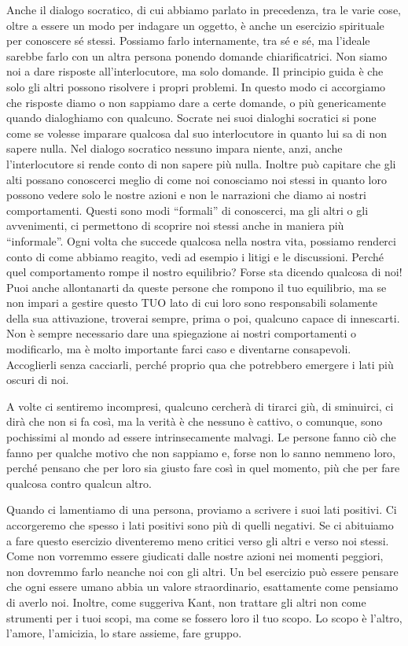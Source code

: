 \documentclass[12pt]{book} %
\begin{document}
Anche il dialogo socratico, di cui abbiamo parlato in precedenza, tra le varie cose, oltre a essere un modo per indagare
un oggetto, è anche un esercizio spirituale per conoscere sé stessi. Possiamo farlo internamente, tra sé e sé, ma
l'ideale sarebbe farlo con un altra persona ponendo domande chiarificatrici. Non siamo noi a dare
risposte all'interlocutore, ma solo domande. Il principio guida è che solo gli altri possono
risolvere i propri problemi. In questo modo ci accorgiamo che risposte diamo o non sappiamo dare a certe domande, o più
genericamente quando dialoghiamo con qualcuno. Socrate nei suoi dialoghi socratici si pone come se volesse imparare
qualcosa dal suo interlocutore in quanto lui sa di non sapere nulla. Nel dialogo socratico nessuno impara niente, anzi,
anche l'interlocutore si rende conto di non sapere più nulla. Inoltre può capitare che gli alti possano conoscerci
meglio di come noi conosciamo noi stessi in quanto loro possono vedere solo le nostre azioni e non le narrazioni che
diamo ai nostri comportamenti. Questi sono modi “formali” di conoscerci, ma gli altri o gli avvenimenti, ci permettono
di scoprire noi stessi anche in maniera più “informale”. Ogni volta che succede qualcosa nella nostra vita, possiamo
renderci conto di come abbiamo reagito, vedi ad esempio i litigi e le discussioni. Perché quel comportamento rompe il
nostro equilibrio? Forse sta dicendo qualcosa di noi! Puoi anche allontanarti da queste persone che rompono il tuo
equilibrio, ma se non impari a gestire questo TUO lato di cui loro sono responsabili solamente della sua attivazione,
troverai sempre, prima o poi, qualcuno capace di innescarti. Non è sempre necessario dare una spiegazione ai nostri
comportamenti o modificarlo, ma è molto importante farci caso e diventarne consapevoli. Accoglierli senza cacciarli,
perché proprio qua che potrebbero emergere i lati più oscuri di noi.


\bigskip

A volte ci sentiremo incompresi, qualcuno cercherà di tirarci giù, di sminuirci, ci dirà che non si fa così, ma la
verità è che nessuno è cattivo, o comunque, sono pochissimi al mondo ad essere intrinsecamente malvagi. Le persone
fanno ciò che fanno per qualche motivo che non sappiamo e, forse non lo sanno nemmeno loro, perché pensano che per loro
sia giusto fare così in quel momento, più che per fare qualcosa contro qualcun altro.

Quando ci lamentiamo di una persona, proviamo a scrivere i suoi lati positivi. Ci accorgeremo che spesso i lati positivi
sono più di quelli negativi. Se ci abituiamo a fare questo esercizio diventeremo meno critici verso gli altri e verso
noi stessi. Come non vorremmo essere giudicati dalle nostre azioni nei momenti peggiori, non dovremmo farlo neanche noi
con gli altri. Un bel esercizio può essere pensare che ogni essere umano abbia un valore straordinario, esattamente
come pensiamo di averlo noi. Inoltre, come suggeriva Kant, non trattare gli altri non come strumenti per i tuoi scopi,
ma come se fossero loro il tuo scopo. Lo scopo è l'altro, l'amore, l'amicizia, lo stare assieme, fare gruppo. 
\end{document}
